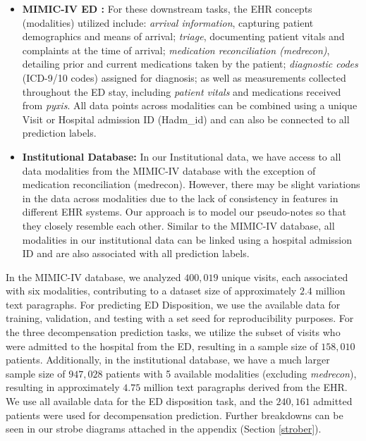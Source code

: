 \documentclass{article}
\theoremstyle{plain}
\theoremstyle{definition}
\theoremstyle{remark}
\begin{document}
\begin{itemize}
    \item \textbf{MIMIC-IV ED \citep{Johnson2023MIMICIVED}:} For these downstream tasks, the EHR concepts (modalities) utilized include: \textit{arrival information}, capturing patient demographics and means of arrival; \textit{triage}, documenting patient vitals and complaints at the time of arrival; \textit{medication reconciliation (medrecon)}, detailing prior and current medications taken by the patient; \textit{diagnostic codes} (ICD-9/10 codes) assigned for diagnosis; as well as measurements collected throughout the ED stay, including \textit{patient vitals} and medications received from \textit{pyxis}. All data points across modalities can be combined using a unique Visit or Hospital admission ID (Hadm\_id) and can also be connected to all prediction labels. 
    \item \textbf{Institutional Database:} 
    In our Institutional data, we have access to all data modalities from the MIMIC-IV database with the exception of medication reconciliation (medrecon). However, there may be slight variations in the data across modalities due to the lack of consistency in features in different EHR systems. Our approach is to model our pseudo-notes so that they closely resemble each other. Similar to the MIMIC-IV database, all modalities in our institutional data can be linked using a hospital admission ID and are also associated with all prediction labels.

\end{itemize}

\vspace{-0.2cm}

In the MIMIC-IV database, we analyzed $400,019$ unique visits, each associated with six modalities, contributing to a dataset size of approximately $2.4$ million text paragraphs. For predicting ED Disposition, we use the available data for training, validation, and testing with a set seed for reproducibility purposes. For the three decompensation prediction tasks, we utilize the subset of visits who were admitted to the hospital from the ED, resulting in a sample size of $158,010$ patients. Additionally, in the institutional database, we have a much larger sample size of $947,028$ patients with 5 available modalities (excluding \textit{medrecon}), resulting in approximately $4.75$ million text paragraphs derived from the EHR. We use all available data for the ED disposition task, and the $240,161$ admitted patients were used for decompensation prediction. Further breakdowns can be seen in our strobe diagrams attached in the appendix (Section \ref{strober}).
\end{document}
